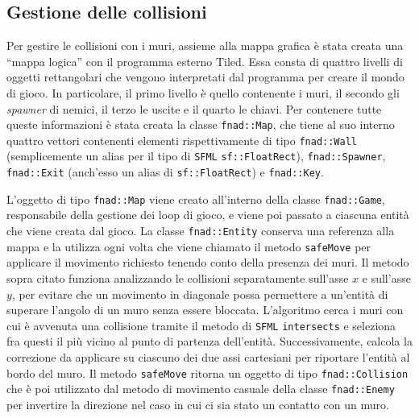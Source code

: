 \documentclass{article}
\newcommand{\quotes}[1]{``#1''}
\begin{document}
\subsection{Gestione delle collisioni}
Per gestire le collisioni con i muri, assieme alla mappa grafica è stata creata una \quotes{mappa logica} con il programma esterno Tiled. Essa consta di quattro livelli di oggetti rettangolari che vengono interpretati dal programma per creare il mondo di gioco. In particolare, il primo livello è quello contenente i muri, il secondo gli \textit{spawner} di nemici, il terzo le uscite e il quarto le chiavi. Per contenere tutte queste informazioni è stata creata la classe \verb|fnad::Map|, che tiene al suo interno quattro vettori contenenti elementi rispettivamente di tipo \verb|fnad::Wall| (semplicemente un alias per il tipo di \verb|SFML| \verb|sf::FloatRect|), \verb|fnad::Spawner|, \verb|fnad::Exit| (anch'esso un alias di \verb|sf::FloatRect|) e \verb|fnad::Key|.

L'oggetto di tipo \verb|fnad::Map| viene creato all'interno della classe \verb|fnad::Game|, responsabile della gestione dei loop di gioco, e viene poi passato a ciascuna entità che viene creata dal gioco. La classe \verb|fnad::Entity| conserva una referenza alla mappa e la utilizza ogni volta che viene chiamato il metodo \verb|safeMove| per applicare il movimento richiesto tenendo conto della presenza dei muri. Il metodo sopra citato funziona analizzando le collisioni separatamente sull'asse $x$ e sull'asse $y$, per evitare che un movimento in diagonale possa permettere a un'entità di superare l'angolo di un muro senza essere bloccata. L'algoritmo cerca i muri con cui è avvenuta una collisione tramite il metodo di \verb|SFML| \verb|intersects| e seleziona fra questi il più vicino al punto di partenza dell'entità. Successivamente, calcola la correzione da applicare su ciascuno dei due assi cartesiani per riportare l'entità al bordo del muro. Il metodo \verb|safeMove| ritorna un oggetto di tipo \verb|fnad::Collision| che è poi utilizzato dal metodo di movimento casuale della classe \verb|fnad::Enemy| per invertire la direzione nel caso in cui ci sia stato un contatto con un muro.
\end{document}
